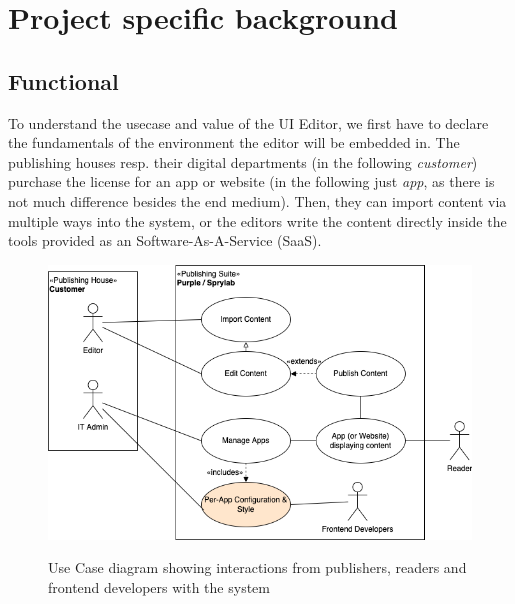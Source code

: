 \section{Project specific background}

\subsection{Functional}


To understand the usecase and value of the UI Editor, we first have to declare the fundamentals of the environment the editor will be embedded in.
The publishing houses resp. their digital departments (in the following \textit{customer}) purchase the license for an app or website (in the following just \textit{app}, as there is not much difference besides the end medium).
Then, they can import content via multiple ways into the system, or the editors write the content directly inside the tools provided as an Software-As-A-Service (SaaS).

\begin{figure}[h]
  \caption{Use Case diagram showing interactions from publishers, readers and frontend developers with the system}
  \includegraphics[width=\textwidth]{pics/purple-abstract.drawio.png}
  \label{fig:usecase1}
\end{figure}

